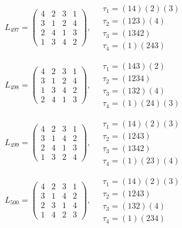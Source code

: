 $L_{497} = \begin{pmatrix} 4 & 2 & 3 & 1 \\ 3 & 1 & 2 & 4 \\ 2 & 4 & 1 & 3 \\ 1 & 3 & 4 & 2 \end{pmatrix}, \quad \begin{matrix} \tau_{1} = (1 4)(2)(3) \\ \tau_{2} = (1 2 3)(4) \\ \tau_{3} = (1 3 4 2) \\ \tau_{4} = (1)(2 4 3) \end{matrix}$

$L_{498} = \begin{pmatrix} 4 & 2 & 3 & 1 \\ 3 & 1 & 2 & 4 \\ 1 & 3 & 4 & 2 \\ 2 & 4 & 1 & 3 \end{pmatrix}, \quad \begin{matrix} \tau_{1} = (1 4 3)(2) \\ \tau_{2} = (1 2 3 4) \\ \tau_{3} = (1 3 2)(4) \\ \tau_{4} = (1)(2 4)(3) \end{matrix}$

$L_{499} = \begin{pmatrix} 4 & 2 & 3 & 1 \\ 3 & 1 & 4 & 2 \\ 2 & 4 & 1 & 3 \\ 1 & 3 & 2 & 4 \end{pmatrix}, \quad \begin{matrix} \tau_{1} = (1 4)(2)(3) \\ \tau_{2} = (1 2 4 3) \\ \tau_{3} = (1 3 4 2) \\ \tau_{4} = (1)(2 3)(4) \end{matrix}$

$L_{500} = \begin{pmatrix} 4 & 2 & 3 & 1 \\ 3 & 1 & 4 & 2 \\ 2 & 3 & 1 & 4 \\ 1 & 4 & 2 & 3 \end{pmatrix}, \quad \begin{matrix} \tau_{1} = (1 4)(2)(3) \\ \tau_{2} = (1 2 4 3) \\ \tau_{3} = (1 3 2)(4) \\ \tau_{4} = (1)(2 3 4) \end{matrix}$

